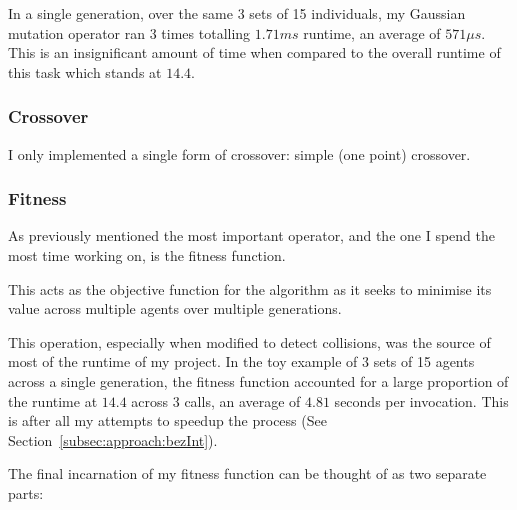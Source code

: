 In a single generation, over the same 3 sets of 15 individuals, my Gaussian mutation operator ran 3 times totalling $1.71 ms$ runtime, an average of $571\mu s$. This is an insignificant amount of time when compared to the overall runtime of this task which stands at $14.4$.

\subsubsection{Crossover}

I only implemented a single form of crossover: simple (one point) crossover.


\subsubsection{Fitness}

As previously mentioned the most important operator, and the one I spend the most time working on, is the fitness function.

This acts as the objective function for the algorithm as it seeks to minimise its value across multiple agents over multiple generations.

This operation, especially when modified to detect collisions, was the source of most of the runtime of my project. In the toy example of 3 sets of 15 agents across a single generation, the fitness function accounted for a large proportion of the runtime at $14.4$ across 3 calls, an average of $4.81$ seconds per invocation. This is after all my attempts to speedup the process (See Section~\ref{subsec:approach:bezInt}).

The final incarnation of my fitness function can be thought of as two separate parts:


